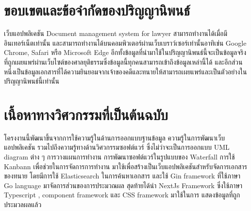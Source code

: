 \documentclass[12pt,oneside,openright,a4paper]{cpe-thai-project}
\begin{document}
\section{ขอบเขตและข้อจำกัดของปริญญานิพนธ์}
\hspace*{1cm}เว็บแอปพลิเคชัน Document management system for lawyer สามารถทำงานได้เมื่อมีอินเทอร์เน็ตเท่านั้น และสามารถทำงานได้บนคอมพิวเตอร์ผ่านเว็บเบราว์เซอร์เท่านั้นอาทิเช่น Google Chrome, Safari หรือ Microsoft Edge อีกทั้งข้อมูลที่นำมาใช้ในปริญญานิพนธ์นี้จะเป็นข้อมูลจริงที่ถูกเผยแพร่ผ่านเว็บไซต์ของศาลยุติธรรมซึ่งข้อมูลนี้ทุกคนสามารถเข้าถึงข้อมูลเหล่านี้ได้ และอีกส่วนหนึ่งเป็นข้อมูลเอกสารที่ได้ความยินยอมจากเจ้าของคดีและทนายให้สามารถเผยแพร่และเป็นตัวอย่างในปริญญานิพนธ์นี้เท่านั้น

\section{เนื้อหาทางวิศวกรรมที่เป็นต้นฉบับ}
\hspace*{1cm}โครงงานนี้พัฒนาขึ้นจากการใช้ความรู้ในด้านการออกแบบฐานข้อมูล ความรู้ในการพัฒนาเว็บแอปพลิเคชัน รวมไปถึงความรู้ทางด้านวิศวกรรมซอฟต์แวร์ ซึ่งไม่ว่าจะเป็นการออกแบบ UML diagram ต่าง ๆ การวางแผนการทำงาน การพัฒนาซอฟต์แวร์ในรูปแบบของ Waterfall การใช้ Kanbann เพื่อช่วยในการจัดการการทำงาน มาใช้เพื่อสร้างเป็นเว็บแอปพลิเคชันสำหรับจัดการเอกสารของทนาย โดยมีการใช้ Elasticsearch ในการค้นหาเอกสาร และใช้ Gin framework ที่ใช้ภาษา Go language มาจัดการส่วนของการประมวณผล สุดท้ายได้นำ NextJs Framework ซึ่งใช้ภาษา Typescript , component framework และ CSS framework มาใช้ในการ แสดงข้อมูลที่ถูกประมวลผลแล้ว 

\newpage
\end{document}
